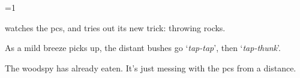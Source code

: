\ifnum\value{temperature}=1
\woodspy

 watches the \glspl{pc}, and tries out its new trick: throwing rocks.

\begin{boxtext}
  As a mild breeze picks up, the distant bushes go `\textit{tap-tap}', then `\textit{tap-thunk}'.
\end{boxtext}

The \gls{woodspy} has already eaten.
It's just messing with the \glspl{pc} from a distance.

\fi
